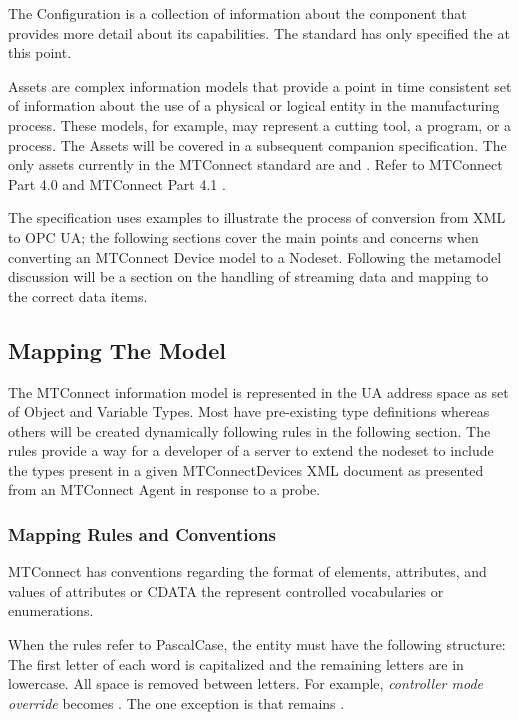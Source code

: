 The \gls{Configuration} is a collection of information about the component that provides more detail about its capabilities. The standard has only specified the  at this point.

\glspl{Asset} are complex information models that provide a point in time consistent set of information about the use of a physical or logical entity in the manufacturing process. These models, for example, may represent a cutting tool, a program, or a process. The \glspl{Asset} will be covered in a subsequent companion specification. The only assets currently in the MTConnect standard are  and . Refer to MTConnect Part 4.0 \cite{MTCPart40} and MTConnect Part 4.1 \cite{MTCPart41}.

The specification uses examples to illustrate the process of conversion from XML to OPC UA; the following sections cover the main points and concerns when converting an MTConnect Device model to a Nodeset. Following the metamodel discussion will be a section on the handling of streaming data and mapping to the correct data items. 

\subsection{Mapping The Model}
\lstset{language=XML,numbers=left,xleftmargin=2em}

The MTConnect information model is represented in the UA address space as set of \gls{Object} and \gls{Variable} \glspl{Type}. Most have pre-existing type definitions whereas others will be created dynamically following rules in the following section. The rules provide a way for a developer of a server to extend the nodeset to include the types present in a given MTConnectDevices XML document as presented from an MTConnect \gls{Agent} in response to a \gls{probe}.

\subsubsection{Mapping Rules and Conventions}\label{sec:mapping-rules}

MTConnect has conventions regarding the format of elements, attributes, and values of attributes or CDATA the represent controlled vocabularies or enumerations. 

When the rules refer to \gls{PascalCase}, the entity must have the following structure: The first letter of each word is capitalized and the remaining letters are in lowercase. All space is removed between letters. For example, \textit{controller mode override} becomes . The one exception is  that remains .

